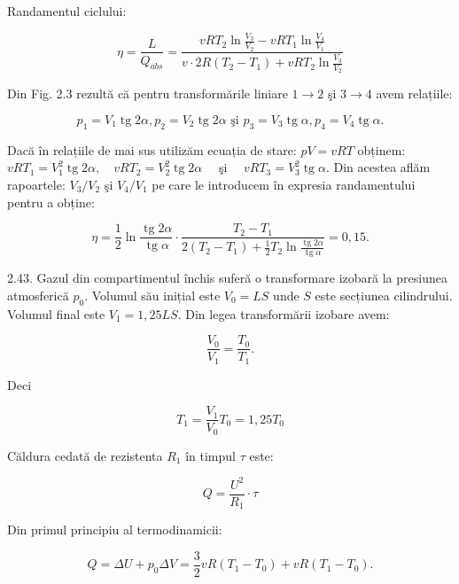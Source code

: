 \documentclass[10pt]{article}
\begin{document}
Randamentul ciclului:

$$
\eta=\frac{L}{Q_{a b s}}=\frac{v R T_{2} \ln \frac{V_{3}}{V_{2}}-v R T_{1} \ln \frac{V_{4}}{V_{1}}}{v \cdot 2 R\left(T_{2}-T_{1}\right)+v R T_{2} \ln \frac{V_{3}}{V_{2}}}
$$

Din Fig. 2.3 rezultă că pentru transformările liniare $1 \rightarrow 2$ şi $3 \rightarrow 4$ avem relațiile:

$$
p_{1}=V_{1} \operatorname{tg} 2 \alpha, p_{2}=V_{2} \operatorname{tg} 2 \alpha \text { şi } p_{3}=V_{3} \operatorname{tg} \alpha, p_{4}=V_{4} \operatorname{tg} \alpha .
$$

Dacă în relațiile de mai sus utilizăm ecuația de stare: $p V=v R T$ obținem: $v R T_{1}=V_{1}^{2} \operatorname{tg} 2 \alpha, \quad v R T_{2}=V_{2}^{2} \operatorname{tg} 2 \alpha \quad$ şi $\quad v R T_{3}=V_{3}^{2} \operatorname{tg} \alpha$. Din acestea aflăm rapoartele: $V_{3} / V_{2}$ şi $V_{4} / V_{1}$ pe care le introducem în expresia randamentului pentru a obține:

$$
\eta=\frac{1}{2} \ln \frac{\operatorname{tg} 2 \alpha}{\operatorname{tg} \alpha} \cdot \frac{T_{2}-T_{1}}{2\left(T_{2}-T_{1}\right)+\frac{1}{2} T_{2} \ln \frac{\operatorname{tg} 2 \alpha}{\operatorname{tg} \alpha}}=0,15 .
$$

2.43. Gazul din compartimentul închis suferă o transformare izobară la presiunea atmosferică $p_{0}$. Volumul său inițial este $V_{0}=L S$ unde $S$ este secțiunea cilindrului. Volumul final este $V_{1}=1,25 L S$. Din legea transformării izobare avem:

$$
\frac{V_{0}}{V_{1}}=\frac{T_{0}}{T_{1}} .
$$

Deci


\begin{equation*}
T_{1}=\frac{V_{1}}{V_{0}} T_{0}=1,25 T_{0} \tag{1}
\end{equation*}


Căldura cedată de rezistenta $R_{1}$ în timpul $\tau$ este:


\begin{equation*}
Q=\frac{U^{2}}{R_{1}} \cdot \tau \tag{2}
\end{equation*}


Din primul principiu al termodinamicii:


\begin{equation*}
Q=\Delta U+p_{0} \Delta V=\frac{3}{2} v R\left(T_{1}-T_{0}\right)+v R\left(T_{1}-T_{0}\right) . \tag{3}
\end{equation*}
\end{document}
